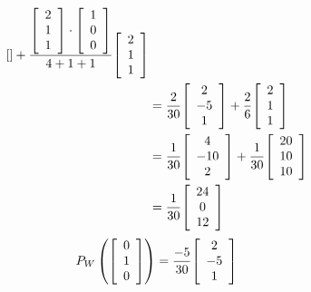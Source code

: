 \documentclass[11pt, a4paper, norsk]{NTNUoving}
\newenvironment{pkt}{\begin{punkt}}{\end{punkt}}
\newenvironment{matrise}[1][c]{
        \left[
            \begin{array}{#1}
    }
    {    
    \end{array}
    \right]           
}
\begin{document}
\begin{oppgave}
\begin{pkt}
\begin{align*}
\begin{matrise}
            \end{matrise} + \frac{\begin{matrise}
            2\\1\\1
            \end{matrise} \cdot \begin{matrise}
            1\\0\\0
            \end{matrise}}{4+1+1}\begin{matrise}
            2\\1\\1
            \end{matrise}
            \\&=\frac{2}{30}\begin{matrise}
            2\\-5\\1
            \end{matrise} + \frac{2}{6}\begin{matrise}
            2\\1\\1
            \end{matrise}
            \\&=\frac{1}{30}\begin{matrise}
            4\\-10\\2
            \end{matrise} + \frac{1}{30}\begin{matrise}
            20\\10\\10
            \end{matrise}
            \\&=\frac{1}{30}\begin{matrise}
            24\\0\\12
            \end{matrise}\\
        \end{align*}
        \begin{align*}
            P_W\left( \begin{matrise}
            0\\1\\0
            \end{matrise}\right) &= \frac{-5}{30}\begin{matrise}
            2\\-5\\1

\end{matrise}
\end{align*}
\end{pkt}
\end{oppgave}
\end{document}
